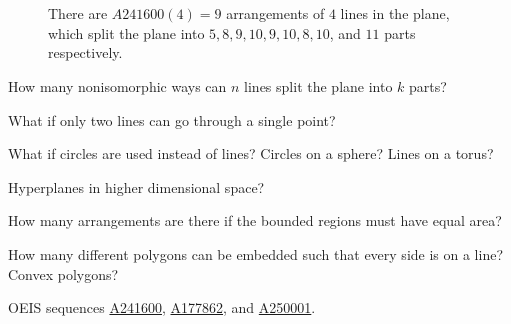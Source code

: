 \documentclass{article}
\begin{document}
\begin{figure}[ht!]
  \noindent
  ~
  ~
  \caption{There are $A241600(4) = 9$ arrangements of $4$ lines in the plane,
  which split the plane into $5, 8, 9, 10, 9, 10, 8, 10$, and $11$ parts
  respectively.}
\end{figure}

\begin{question}
  How many nonisomorphic ways can $n$ lines split the plane into $k$ parts?
\end{question}

\begin{related}
  \item What if only two lines can go through a single point?
  \item What if circles are used instead of lines? Circles on a sphere? Lines on a torus?
  \item Hyperplanes in higher dimensional space?
  \item How many arrangements are there if the bounded regions must have equal
    area?
  \item How many different polygons can be embedded such that every side is
    on a line? Convex polygons?
\end{related}

\begin{references}
  \item OEIS sequences
    \href{https://oeis.org/A241600}{A241600},
    \href{https://oeis.org/A177862}{A177862}, and
    \href{https://oeis.org/A250001}{A250001}.
\end{references}
\end{document}
